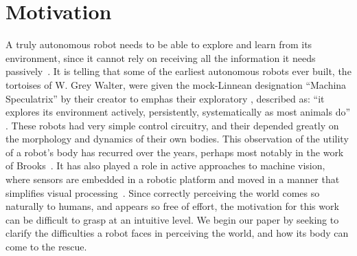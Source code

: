 
\section{Motivation}

A truly autonomous robot needs to be able to explore and learn from
its environment, since it cannot rely on receiving all the information
it needs passively~\cite{whaite97autonomous}.
It is telling that some of the earliest autonomous robots ever built,
the tortoises of W. Grey Walter, were given the mock-Linnean
designation ``Machina Speculatrix'' by their creator to emphas\ize{} their exploratory
\ahhbehavior{}, described as: ``it explores its environment actively,
persistently, systematically as most animals do''
\cite{walter50imitation}.
These robots had very simple control circuitry, and their \ahhbehavior{}
depended greatly on the morphology and dynamics of their own bodies.
%
This observation of the utility of a robot's body has recurred over
the years, perhaps most notably in the work of
Brooks~\cite{group-AAAI-98}.  It has also played a role in active
approaches to machine vision, where sensors are embedded in a robotic
platform and moved in a manner that simplifies visual
processing~\cite{ballard91animate}.
%
Since correctly perceiving the world comes so naturally to humans, and
appears so free of effort, the motivation for this work can be
difficult to grasp at an intuitive level.  We begin our paper by
seeking to clarify the difficulties a robot faces in perceiving the
world, and how its body can come to the rescue.



